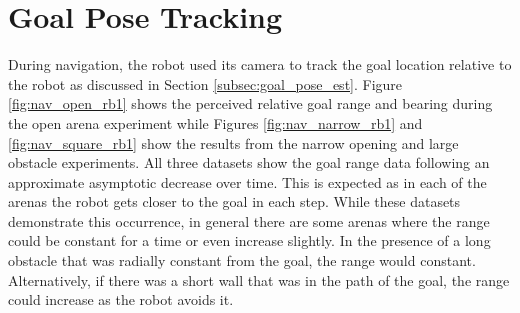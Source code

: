 \section{Goal Pose Tracking} \label{sec:nav_goal_pose_tracking}
During navigation, the robot used its camera to track the goal location relative to
the robot as discussed in Section \ref{subsec:goal_pose_est}. 
Figure \ref{fig:nav_open_rb1} shows the perceived relative goal range and bearing during the open arena
experiment while Figures \ref{fig:nav_narrow_rb1} and \ref{fig:nav_square_rb1} show the results from the
narrow opening and large obstacle experiments.
All three datasets show the goal range data following an approximate asymptotic decrease over time.
This is expected as in each of the arenas the robot gets closer to the goal in each step.
While these datasets demonstrate this occurrence, in general there are some arenas where the range
could be constant for a time or even increase slightly. In the presence of a long obstacle that was
radially constant from the goal, the range would constant. Alternatively, if there was a short wall
that was in the path of the goal, the range could increase as the robot avoids it.


